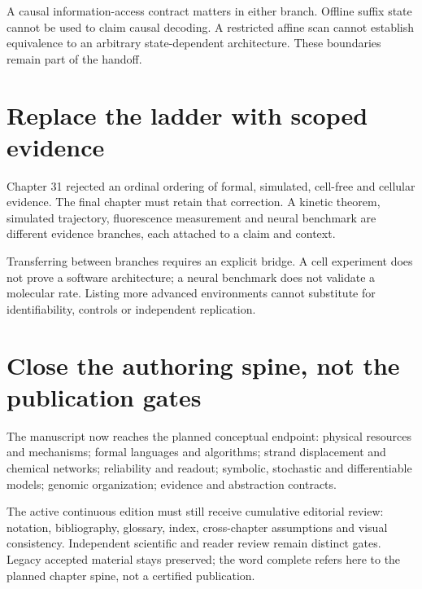 A causal information-access contract matters in either branch. Offline suffix
state cannot be used to claim causal decoding. A restricted affine scan cannot
establish equivalence to an arbitrary state-dependent architecture. These
boundaries remain part of the handoff.

\section{Replace the ladder with scoped evidence}
Chapter 31 rejected an ordinal ordering of formal, simulated, cell-free and
cellular evidence. The final chapter must retain that correction.
A kinetic theorem, simulated trajectory, fluorescence measurement and neural
benchmark are different evidence branches, each attached to a claim and context.

Transferring between branches requires an explicit bridge. A cell experiment
does not prove a software architecture; a neural benchmark does not validate a
molecular rate. Listing more advanced environments cannot substitute for
identifiability, controls or independent replication.

\section{Close the authoring spine, not the publication gates}
The manuscript now reaches the planned conceptual endpoint: physical resources
and mechanisms; formal languages and algorithms; strand displacement and
chemical networks; reliability and readout; symbolic, stochastic and
differentiable models; genomic organization; evidence and abstraction contracts.

The active continuous edition must still receive cumulative editorial review:
notation, bibliography, glossary, index, cross-chapter assumptions and visual
consistency. Independent scientific and reader review remain distinct gates.
Legacy accepted material stays preserved; the word complete refers here to
the planned chapter spine, not a certified publication.

